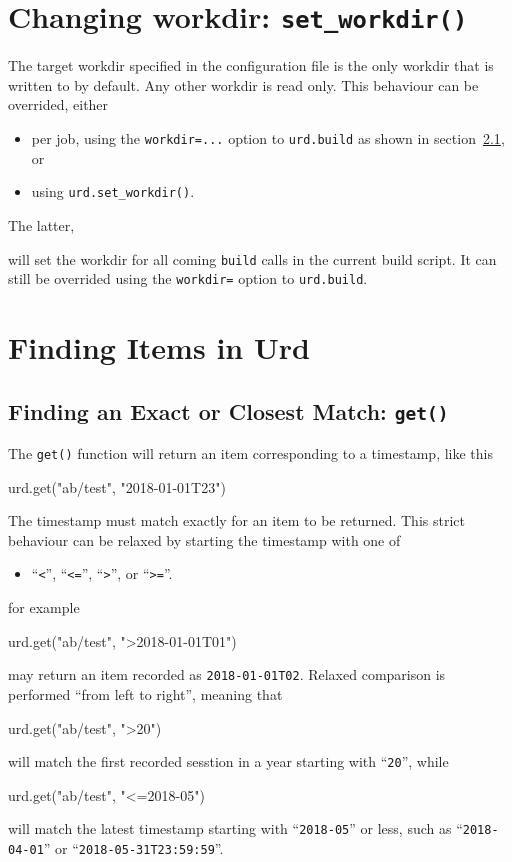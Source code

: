 \section{Changing workdir:  \texttt{set\_workdir()}}
The target workdir specified in the configuration file is the only
workdir that is written to by default.  Any other workdir is read
only.  This behaviour can be overrided, either
\begin{itemize}
\item[] per job, using the \texttt{workdir=...} option to \texttt{urd.build} as shown in section~\ref{}, or
\item[] using \texttt{urd.set\_workdir()}.
\end{itemize}
The latter,
\begin{python}
def main(urd):
    urd.set_workdir(<workdir>)}
\end{python}
will set the workdir for all coming \texttt{build} calls in the
current build script.  It can still be overrided using
the \texttt{workdir=} option to \texttt{urd.build}.












\section{Finding Items in Urd}

\subsection{Finding an Exact or Closest Match:  \texttt{get()}}
The \texttt{get()} function will return an item corresponding to a
timestamp, like this
\begin{python}
urd.get("ab/test", "2018-01-01T23")
\end{python}
The timestamp must match exactly for an item to be returned.  This
strict behaviour can be relaxed by starting the timestamp with
one of
\begin{itemize}
\item[] ``\texttt{<}'', ``\texttt{<=}'', ``\texttt{>}'', or ``\texttt{>=}''.
\end{itemize}
for example
\begin{python}
urd.get("ab/test", ">2018-01-01T01")
\end{python}
may return an item recorded as \texttt{2018-01-01T02}.  Relaxed
comparison is performed ``from left to right'', meaning that
\begin{python}
urd.get("ab/test", ">20")
\end{python}
will match the first recorded sesstion in a year starting with
``\texttt{20}'', while
\begin{python}
urd.get("ab/test", "<=2018-05")
\end{python}
will match the latest timestamp starting with ``\texttt{2018-05}'' or less,
such as ``\texttt{2018-04-01}'' or ``\texttt{2018-05-31T23:59:59}''.


